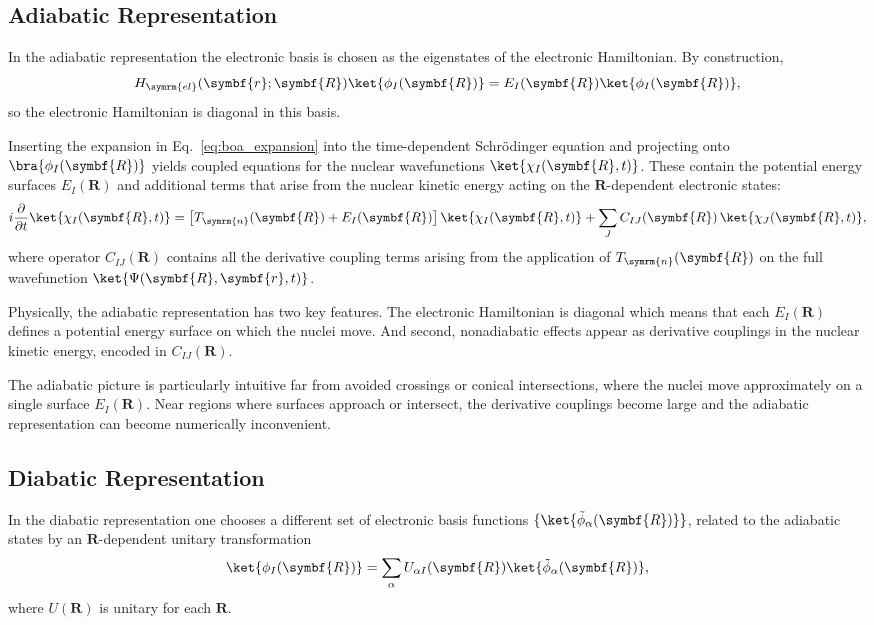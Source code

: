 \subsection{Adiabatic Representation}\label{sec:adiabatic_representation}
In the adiabatic representation the electronic basis is chosen as the eigenstates of the electronic Hamiltonian. By construction,
\begin{equation}
H_{\symrm{el}}(\symbf{r};\symbf{R})\ket{\phi_I(\symbf{R})}=E_I(\symbf{R})\ket{\phi_I(\symbf{R})},
\end{equation}
so the electronic Hamiltonian is diagonal in this basis.

Inserting the expansion in Eq.~\eqref{eq:boa_expansion} into the time-dependent Schr\"odinger equation and projecting onto $\bra{\phi_I(\symbf{R})}$ yields coupled equations for the nuclear wavefunctions $\ket{\chi_I(\symbf{R},t)}$. These contain the potential energy surfaces $E_I(\symbf{R})$ and additional terms that arise from the nuclear kinetic energy acting on the $\symbf{R}$-dependent electronic states:
\begin{equation}
i\frac{\partial}{\partial{t}}\ket{\chi_I(\symbf{R},t)}=\left[T_{\symrm{n}}(\symbf{R})+E_I(\symbf{R})\right]\ket{\chi_I(\symbf{R},t)}+\sum_JC_{IJ}(\symbf{R})\,\ket{\chi_J(\symbf{R},t)},
\end{equation}
where operator $C_{IJ}(\symbf{R})$ contains all the derivative coupling terms arising from the application of $T_{\symrm{n}}(\symbf{R})$ on the full wavefunction $\ket{\Psi(\symbf{R},\symbf{r},t)}$.

Physically, the adiabatic representation has two key features. The electronic Hamiltonian is diagonal which means that each $E_I(\symbf{R})$ defines a potential energy surface on which the nuclei move. And second, nonadiabatic effects appear as derivative couplings in the nuclear kinetic energy, encoded in $C_{IJ}(\symbf{R})$.

The adiabatic picture is particularly intuitive far from avoided crossings or conical intersections, where the nuclei move approximately on a single surface $E_I(\symbf{R})$. Near regions where surfaces approach or intersect, the derivative couplings become large and the adiabatic representation can become numerically inconvenient.
\subsection{Diabatic Representation}\label{sec:diabatic_representation}
In the diabatic representation one chooses a different set of electronic basis functions $\{\ket{\tilde\phi_\alpha(\symbf{R})}\}$, related to the adiabatic states by an $\symbf{R}$-dependent unitary transformation
\begin{equation}\label{eq:unitary_transform}
\ket{\phi_I(\symbf{R})}=\sum_\alpha U_{\alpha I}(\symbf{R})\ket{\tilde\phi_\alpha(\symbf{R})},
\end{equation}
where $U(\symbf{R})$ is unitary for each $\symbf{R}$.

